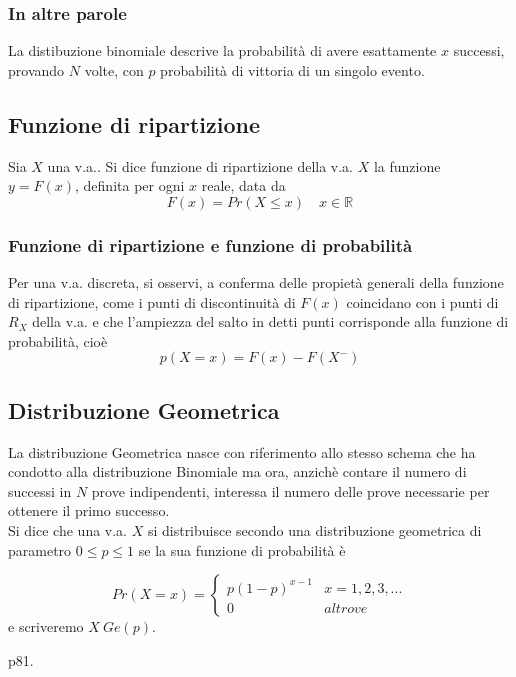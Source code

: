 \documentclass[12pt]{report}
\begin{document}
   \subsubsection{In altre parole}
   La distibuzione binomiale descrive la probabilità di avere esattamente $x$ successi, provando $N$ volte, con $p$ probabilità di vittoria di un singolo evento.

   \subsection{Funzione di ripartizione}
   Sia $X$ una v.a.. Si dice funzione di ripartizione della v.a. $X$ la funzione $y=F(x)$, definita per ogni $x$ reale, data da
   \[ F(x) = Pr(X \leq x) \quad x \in \mathbb{R} \]

  \subsubsection{Funzione di ripartizione e funzione di probabilità}
  Per una v.a. discreta, si osservi, a conferma delle propietà generali della funzione di ripartizione, come i punti di discontinuità di $F(x)$ coincidano con i punti di $R_X$ della v.a. e che l'ampiezza del salto in detti punti corrisponde alla funzione di probabilità, cioè
  \[ p(X=x) = F(x) - F(X^-) \]

  \subsection{Distribuzione Geometrica}
  La distribuzione Geometrica nasce con riferimento allo stesso schema che ha condotto alla distribuzione Binomiale ma ora, anzichè contare il numero di successi in $N$ prove indipendenti, interessa il numero delle prove necessarie per ottenere il primo successo.\\

  Si dice che una v.a. $X$ si distribuisce secondo una distribuzione geometrica di parametro $0 \leq p \leq 1$ se la sua funzione di probabilità è

  \[
    Pr(X=x)=
      \begin{cases}
        p(1-p)^{x-1} & x = 1,2,3,... \\
        0 & altrove
      \end{cases}
  \]
  e scriveremo $X ~ Ge(p)$.

p81.
\end{document}
